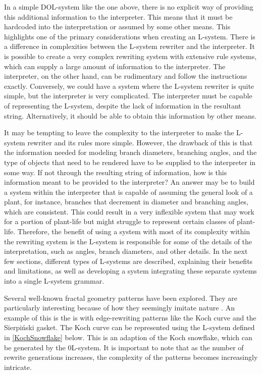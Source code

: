 In a simple DOL-system like the one above, there is no explicit way of providing this additional information to the interpreter. This means that it must be hardcoded into the interpretation or assumed by some other means. This highlights one of the primary considerations when creating an L-system. There is a difference in complexities between the L-system rewriter and the interpreter. It is possible to create a very complex rewriting system with extensive rule systems, which can supply a large amount of information to the interpreter. The interpreter, on the other hand, can be rudimentary and follow the instructions exactly. Conversely, we could have a system where the L-system rewriter is quite simple, but the interpreter is very complicated. The interpreter must be capable of representing the L-system, despite the lack of information in the resultant string. Alternatively, it should be able to obtain this information by other means. 

It may be tempting to leave the complexity to the interpreter to make the L-system rewriter and its rules more simple. However, the drawback of this is that the information needed for modeling branch diameters, branching angles, and the type of objects that need to be rendered have to be supplied to the interpreter in some way. If not through the resulting string of information, how is this information meant to be provided to the interpreter? An answer may be to build a system within the interpreter that is capable of assuming the general look of a plant, for instance, branches that decrement in diameter and branching angles, which are consistent. This could result in a very inflexible system that may work for a portion of plant-life but might struggle to represent certain classes of plant-life. Therefore, the benefit of using a system with most of its complexity within the rewriting system is the L-system is responsible for some of the details of the interpretation, such as angles, branch diameters, and other details. In the next few sections, different types of L-systems are described, explaining their benefits and limitations, as well as developing a system integrating these separate systems into a single L-system grammar.   

Several well-known fractal geometry patterns have been explored. They are particularly interesting because of how they seemingly imitate nature \cite{mandelbrot1982fractal}. An example of this is the is with edge-rewriting patterns like the Koch curve and the Sierpi\'{n}ski gasket. The Koch curve can be represented using the L-system defined in \ref{KochSnowflake} below. This is an adaption of the Koch snowflake, which can be generated by the 0L-system. It is important to note that as the number of rewrite generations increases, the complexity of the patterns becomes increasingly intricate.

